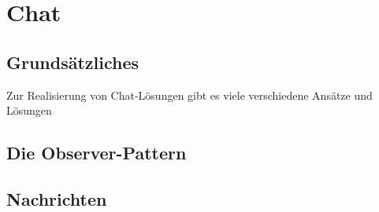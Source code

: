 \section{Chat}

\subsection{Grunds\"atzliches}



Zur Realisierung von Chat-L\"osungen gibt es viele verschiedene Ans\"atze
und L\"osungen


\subsection{Die Observer-Pattern}


\subsection{Nachrichten}
